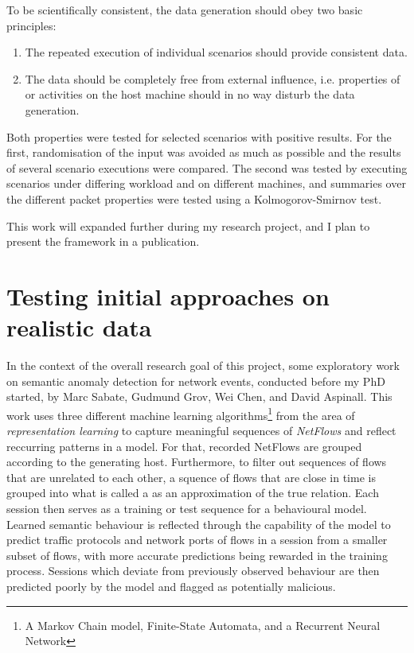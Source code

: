 \documentclass[a4paper,12pt,twoside]{report}
\begin{document}
To be scientifically consistent, the data generation should obey two basic principles: 
\begin{enumerate}
\item The repeated execution of individual scenarios should provide consistent data.

\item The data should be completely free from external influence, i.e. properties of or activities on the host machine should in no way disturb the data generation.
\end{enumerate}

Both properties were tested for selected scenarios with positive results. For the first, randomisation of the input was avoided as much as possible and the results of several scenario executions were compared. The second was tested by executing scenarios under differing workload and on different machines, and summaries over the different packet properties were tested using a Kolmogorov-Smirnov test.  

This work will expanded further during my research project, and I plan to present the framework in a publication. 



\section{Testing initial approaches on realistic data}\label{Prevwork}

In the context of the overall research goal of this project, some exploratory work on semantic anomaly detection for network events, conducted before my PhD started, by Marc Sabate, Gudmund Grov, Wei Chen, and David Aspinall. This work uses three different machine learning algorithms\footnote{A Markov Chain model, Finite-State Automata, and a Recurrent Neural Network} from the area of \textit{representation learning} to capture meaningful sequences of \textit{NetFlows} and reflect reccurring patterns in a model. For that, recorded NetFlows are grouped according to the generating host. Furthermore, to filter out sequences of flows that are unrelated to each other, a squence of flows that are close in time is grouped into what is called a  as an approximation of the true relation. Each session then serves as a training or test sequence for a behavioural model. Learned semantic behaviour is reflected through the capability of the model to predict traffic protocols and network ports of flows in a session from a smaller subset of flows, with more accurate predictions being rewarded in the training process. Sessions which deviate from previously observed behaviour are then predicted poorly by the model and flagged as potentially malicious.
\end{document}
